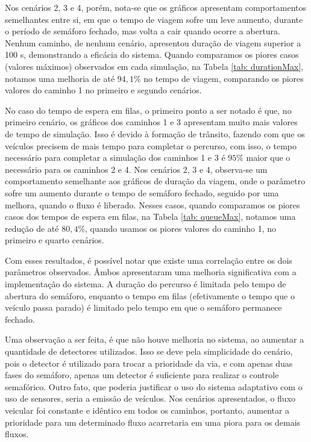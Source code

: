 Nos cenários 2, 3 e 4, porém, nota-se que os gráficos apresentam comportamentos semelhantes entre si, em que o tempo de viagem sofre um leve aumento, durante o período de semáforo fechado, mas volta a cair quando ocorre a abertura. Nenhum caminho, de nenhum cenário, apresentou duração de viagem superior a 100 s, demonstrando a eficácia do sistema. 
Quando comparamos os piores casos (valores máximos) observados em cada simulação, na Tabela \ref{tab: durationMax}, notamos uma melhoria de até $94,1\%$ no tempo de viagem, comparando os piores valores do caminho 1 no primeiro e segundo cenários.

No caso do tempo de espera em filas, o primeiro ponto a ser notado é que, no primeiro cenário, os gráficos dos caminhos 1 e 3 apresentam muito mais valores de tempo de simulação. Isso é devido à formação de trânsito, fazendo com que os veículos precisem de mais tempo para completar o percurso, com isso, o tempo necessário para completar a simulação dos caminhos 1 e 3 é $95\%$ maior que o necessário para os caminhos 2 e 4.
Nos cenários 2, 3 e 4, observa-se um comportamento semelhante aos gráficos de duração da viagem, onde o parâmetro sofre um aumento durante o tempo de semáforo fechado, seguido por uma melhora, quando o fluxo é liberado.
Nesses casos, quando comparamos os piores casos dos tempos de espera em filas, na Tabela \ref{tab: queueMax}, notamos uma redução de até $80,4\%$, quando usamos os piores valores do caminho 1, no primeiro e quarto cenários.

Com esses resultados, é possível notar que existe uma correlação entre os dois parâmetros observados. Âmbos apresentaram uma melhoria significativa com a implementação do sistema. A duração do percurso é limitada pelo tempo de abertura do semáforo, enquanto o tempo em filas (efetivamente o tempo que o veículo passa parado) é limitado pelo tempo em que o semáforo permanece fechado.

Uma observação a ser feita, é que não houve melhoria no sistema, ao aumentar a quantidade de detectores utilizados. Isso se deve pela simplicidade do cenário, pois o detector é utilizado para trocar a prioridade da via, e com apenas duas fases do semáforo, apenas um detector é suficiente para realizar o controle semafórico. Outro fato, que poderia justificar o uso do sistema adaptativo com o uso de sensores, seria a emissão de veículos. Nos cenários apresentados, o fluxo veicular foi constante e idêntico em todos os caminhos, portanto, aumentar a prioridade para um determinado fluxo acarretaria em uma piora para os demais fluxos.